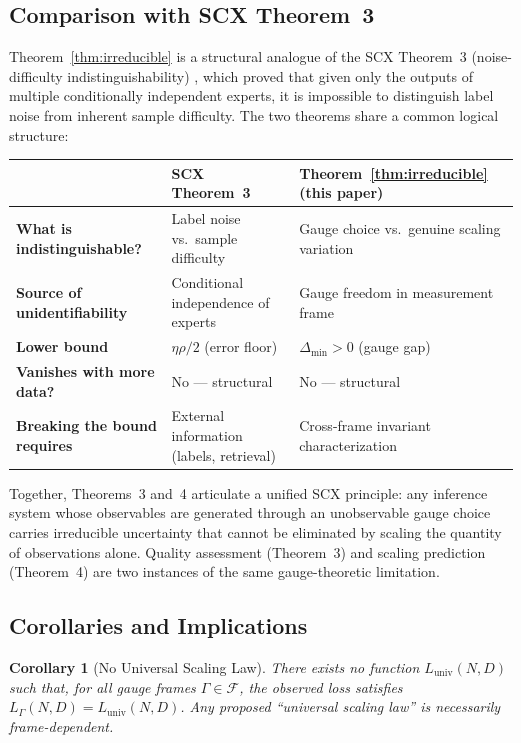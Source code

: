 \documentclass[12pt,a4paper]{article}
\newtheorem{corollary}[theorem]{Corollary}
\theoremstyle{remark}
\newcommand{\Loss}{L}
\begin{document}
\subsection{Comparison with SCX Theorem~3}

Theorem~\ref{thm:irreducible} is a structural analogue of the SCX Theorem~3 (noise-difficulty indistinguishability) \cite{scx2026}, which proved that given only the outputs of multiple conditionally independent experts, it is impossible to distinguish label noise from inherent sample difficulty. The two theorems share a common logical structure:

\begin{center}
\begin{tabular}{@{}lll@{}}
\toprule
& \textbf{SCX Theorem~3} & \textbf{Theorem~\ref{thm:irreducible} (this paper)} \\
\midrule
\textbf{What is indistinguishable?} & Label noise vs.\ sample difficulty & Gauge choice vs.\ genuine scaling variation \\
\textbf{Source of unidentifiability} & Conditional independence of experts & Gauge freedom in measurement frame \\
\textbf{Lower bound} & $\eta\rho/2$ (error floor) & $\Delta_{\min} > 0$ (gauge gap) \\
\textbf{Vanishes with more data?} & No — structural & No — structural \\
\textbf{Breaking the bound requires} & External information (labels, retrieval) & Cross-frame invariant characterization \\
\bottomrule
\end{tabular}
\end{center}

Together, Theorems~3 and~4 articulate a unified SCX principle: any inference system whose observables are generated through an unobservable gauge choice carries irreducible uncertainty that cannot be eliminated by scaling the quantity of observations alone. Quality assessment (Theorem~3) and scaling prediction (Theorem~4) are two instances of the same gauge-theoretic limitation.

\subsection{Corollaries and Implications}

\begin{corollary}[No Universal Scaling Law]
\label{cor:no_universal}
There exists no function $\Loss_{\text{univ}}(N, D)$ such that, for all gauge frames $\Gamma \in \mathcal{F}$, the observed loss satisfies $\Loss_\Gamma(N, D) = \Loss_{\text{univ}}(N, D)$. Any proposed ``universal scaling law'' is necessarily frame-dependent.
\end{corollary}
\end{document}

